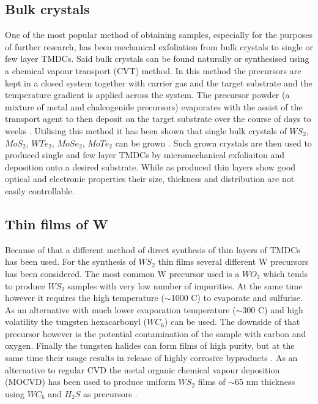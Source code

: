 \subsection{Bulk crystals}
One of the most popular method of obtaining samples, especially for the purposes of further research, has been mechanical exfoliation from bulk crystals to single or few layer TMDCs. Said bulk crystals can be found naturally or synthesised using a chemical vapour transport (CVT) method. In this method the precursors are kept in a closed system together with carrier gas and the target substrate and the temperature gradient is applied across the system. The precursor powder (a mixture of metal and chalcogenide precursors) evaporates with the assist of the transport agent to then deposit on the target substrate over the course of days to weeks \cite{Reale2016}\cite{Schmidt2013}. Utilising this method it has been shown that single bulk crystals of $WS_2$, $MoS_2$, $WTe_2$, $MoSe_2$, $MoTe_2$ can be grown \cite{Reale2016}\cite{Schmidt2013}\cite{Al-Hilli1972}\cite{Brixner1962}\cite{Lenz1997}\cite{Brown1966}\cite{Sunil1997}\cite{Lenz1997}. Such grown crystals are then used to produced single and few layer TMDCs by micromechanical exfoliaiton and deposition onto a desired substrate. While as produced thin layers show good optical and electronic properties their size, thickness and distribution are not easily controllable.

\subsection{Thin films of W}
Because of that a different method of direct synthesis of thin layers of TMDCs has been used. For the synthesis of $WS_2$ thin films several different W precursors has been considered. The most common W precursor used is a $WO_3$ which tends to produce $WS_2$ samples with very low number of impurities. At the same time however it requires the high temperature ($\sim$1000 {\degree}C) to evaporate and sulfurise. As an alternative with much lower evaporation temperature ($\sim$300 {\degree}C) and high volatility the tungsten hexacarbonyl ($WC_6$) can be used. The downside of that precursor however is the potential contamination of the sample with carbon and oxygen. Finally the tungsten halides can form films of high purity, but at the same time their usage results in release of highly corrosive byproducts \cite{Reale2016}. As an alternative to regular CVD the metal organic chemical vapour deposition (MOCVD) has been used to produce uniform $WS_2$ films of $\sim$65 nm thickness using $WC_6$ and $H_2S$ as precursors \cite{Chung1998}.

